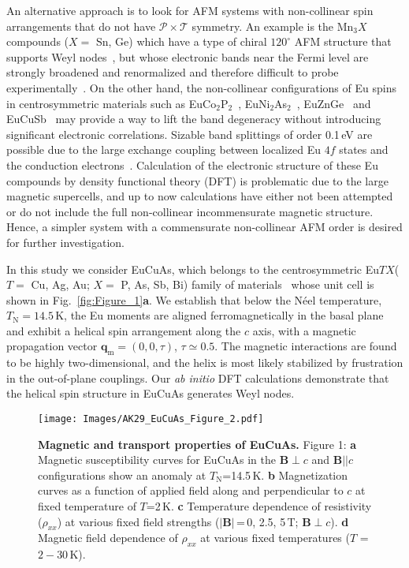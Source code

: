 \documentclass[aps,prl,amsmath,amssymb,amstext,citeautoscript,punctuation,nofootinbib,superscriptaddress,twocolumn]{revtex4-1}
\newcommand{\eca}{EuCuAs}
\begin{document}
An alternative approach is to look for AFM systems with non-collinear spin arrangements that do not have $\mathcal{P}\times \mathcal{T}$ symmetry. An example is the Mn$_3X$ compounds ($X = $ Sn, Ge)  which have a type of chiral $120^\circ$ AFM structure that supports Weyl nodes~\cite{KublerFelser2017}, but whose electronic bands near the Fermi level are strongly broadened and renormalized and therefore difficult to probe experimentally~\cite{Kuroda2017}. On the other hand, the non-collinear  configurations of Eu spins in centrosymmetric materials such as EuCo$_2$P$_2$~\cite{Reehius_1992_ECP}, EuNi$_2$As$_2$~\cite{Jin_2019_ENA}, EuZnGe~\cite{Kurumaji_2022_EZG} and EuCuSb~\cite{Takahasi_2020_ECS}
may provide a way to lift the band degeneracy without introducing significant electronic correlations. Sizable band splittings of order 0.1\,eV are possible due to the large exchange coupling between localized Eu $4f$ states and the conduction electrons~\cite{soh_ideal_2019}. Calculation of the electronic structure of these Eu compounds by density functional theory (DFT) is problematic due to the large magnetic supercells, and up to now calculations have either not been attempted or do not include the full non-collinear incommensurate magnetic structure. Hence, a simpler system with a commensurate non-collinear AFM order is desired for further investigation. 

    In this study we consider \eca{}, which belongs to the centrosymmetric Eu$TX$($T =$ Cu, Ag, Au; $X = $ P, As, Sb, Bi) family of materials~\cite{Mewis1978,Tomuschat1984,du2015dirac,tong2014magnetic,nakamura_thermoelectric_2023,EuAgAs_DFT_Magnetization,Jin_EuAgAs_DFT,EuAuAs_DFT_Magnetization,EuCuP_Expt,EuCuBi_DFT} whose unit cell is shown in Fig.~\ref{fig:Figure_1}\textbf{a}. We establish that below the Néel temperature, $T_\mathrm{N} = 14.5$\,K, the Eu moments are aligned ferromagnetically in the basal plane and exhibit a helical spin arrangement along the $c$ axis, with a magnetic propagation vector $\textbf{q}_\textrm{m}=(0,0,\tau)$, $\tau \simeq 0.5$. The magnetic interactions are found to be highly two-dimensional, and the helix is most likely stabilized by frustration in the out-of-plane couplings. Our \textit{ab initio} DFT calculations demonstrate that the helical spin structure in EuCuAs generates Weyl nodes.


\begin{figure}[t!]
\texttt{[image: Images/AK29\_EuCuAs\_Figure\_2.pdf]}
\caption{\label{fig:Figure_2} \textbf{Magnetic and transport properties of \eca{}.} Figure 1: \textbf{a} Magnetic susceptibility curves for \eca{} in the $\textbf{B}$$\perp$$c$ and $\textbf{B}||c$ configurations show an anomaly at $T_\mathrm{N}$=14.5\,K. \textbf{b} Magnetization curves as a function of applied field along and perpendicular to $c$ at fixed temperature of $T$=2\,K. \textbf{c} Temperature dependence of resistivity ($\rho_{xx}$) at various fixed field strengths ($|\textbf{B}|$\,=\,0, 2.5, 5\,T; $\textbf{B}$$\perp$$c$). \textbf{d} Magnetic field dependence of $\rho_{xx}$ at various fixed temperatures ($T$ = $2-30$\,K). }
	\end{figure}
\end{document}

